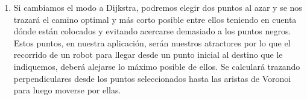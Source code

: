 \begin{enumerate}
        \item Si cambiamos el modo a Dijkstra, podremos elegir dos puntos al azar y se nos trazará el camino optimal y más corto posible entre ellos teniendo en cuenta dónde están colocados y evitando acercarse demasiado a los puntos negros. Estos puntos, en nuestra aplicación, serán nuestros atractores por lo que el recorrido de un robot para llegar desde un punto inicial al destino que le indiquemos, deberá alejarse lo máximo posible de ellos. Se calculará trazando perpendiculares desde los puntos seleccionados hasta las aristas de Voronoi para luego moverse por ellas.
        \begin{figure}[H]
\end{figure}
\end{enumerate}
